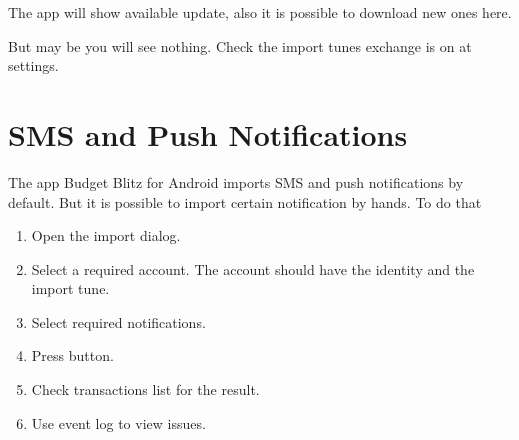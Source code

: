 \documentclass[a4paper,10pt,english]{sphinxmanual}
\begin{document}
The app will show available update, also it is possible to download new ones here.

\noindent{}

\noindent{}

\noindent{}

\noindent{}

But may be you will see nothing. Check the import tunes exchange is on at settings.


\section{SMS and Push Notifications}
\label{\detokenize{import:sms-and-push-notifications}}
The app Budget Blitz for Android imports SMS and push notifications by default. But it is possible to import
certain notification by hands. To do that
\begin{enumerate}
\def\theenumi{\arabic{enumi}}
\def\labelenumi{\theenumi .}
\makeatletter\def\p@enumii{\p@enumi \theenumi .}\makeatother
\item {} 
Open the import dialog.

\item {} 
Select a required account. The account should have the identity and the import tune.

\item {} 
Select required notifications.

\item {} 
Press  button.

\item {} 
Check transactions list for the result.

\item {} 
Use event log to view issues.

\end{enumerate}

\noindent{}

\noindent{}

\noindent{}
\end{document}
